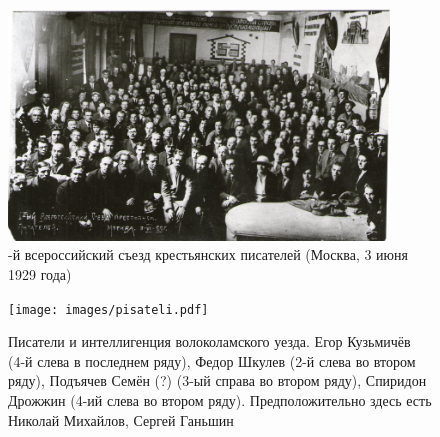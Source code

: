 \begin{figure}
  \centering
  \includegraphics[width=0.9\textwidth]{images/syezd.pdf}
  \caption*{-й всероссийский съезд крестьянских писателей (Москва, 3 июня 1929 года)}
\end{figure}

\begin{figure}
  \centering
  \texttt{[image: images/pisateli.pdf]}
  \caption*{Писатели и интеллигенция волоколамского уезда. Егор Кузьмичёв (4-й слева в последнем ряду), Федор Шкулев (2-й слева во втором ряду), Подъячев Семён (?) (3-ый справа во втором ряду), Спиридон Дрожжин (4-ий слева во втором ряду). Предположительно здесь есть Николай Михайлов, Сергей Ганьшин}
\end{figure}

